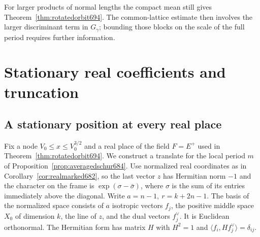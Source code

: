 \documentclass[a4paper,11pt]{article}
\theoremstyle{definition}
\theoremstyle{remark}
\numberwithin{equation}{section}
\begin{document}
For larger products of normal lengths the compact mean still
gives Theorem~\ref{thm:rotatedorbit694}. The common-lattice
estimate then involves the larger discriminant term in
\(G_\gamma\); bounding those blocks on the scale of the full
period requires further information.

\section{Stationary real coefficients and truncation}\label{nav:stationary-cutoff}

\subsection{A stationary position at every real place}
\label{sec:effectivestationary695}

Fix a node \(V_0\le x\le V_0^{3/2}\) and a real place of the
field \(F=E^+\) used in Theorem~\ref{thm:rotatedorbit694}.
We construct a translate for the local period \(m\) of
Proposition~\ref{prop:averagedschur684}. Use normalized real
coordinates as in Corollary~\ref{cor:realmarked682}, so the
last vector \(z\) has Hermitian norm \(-1\) and the character
on the frame is \(\exp(\sigma-\bar\sigma)\), where \(\sigma\)
is the sum of its entries immediately above the diagonal. Write
\(a=n-1,\ r=k+2n-1\). The basis of the normalized space consists
of \(a\) isotropic vectors \(f_j\), the positive middle space
\(X_0\) of dimension \(k\), the line of \(z\), and the dual
vectors \(f_j^\vee\). It is Euclidean orthonormal. The
Hermitian form has matrix \(H\) with \(H^2=1\) and
\(\langle f_i,H f_j^\vee\rangle=\delta_{ij}\).
\end{document}
